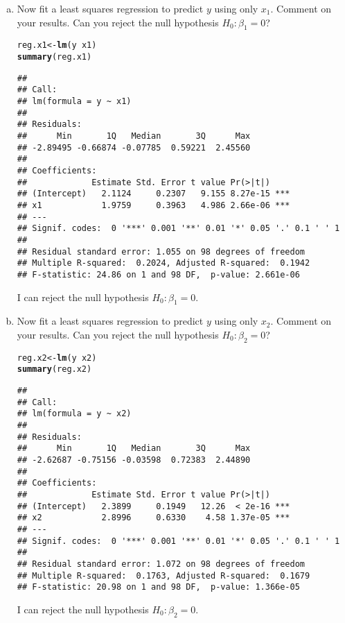 \documentclass[12pt]{article}\usepackage[]{graphicx}\usepackage[]{color}
\makeatletter
\newcommand{\hlopt}[1]{\textcolor[rgb]{0,0,0}{#1}}%
\newcommand{\hlstd}[1]{\textcolor[rgb]{0.345,0.345,0.345}{#1}}%
\newcommand{\hlkwb}[1]{\textcolor[rgb]{0.69,0.353,0.396}{#1}}%
\newcommand{\hlkwd}[1]{\textcolor[rgb]{0.737,0.353,0.396}{\textbf{#1}}}%
\newenvironment{kframe}{%
 \def\at@end@of@kframe{}%
 \ifinner\ifhmode%
  \def\at@end@of@kframe{\end{minipage}}%
  \begin{minipage}{\columnwidth}%
 \fi\fi%
 \def\FrameCommand##1{\hskip\@totalleftmargin \hskip-\fboxsep
 \colorbox{shadecolor}{##1}\hskip-\fboxsep
     \hskip-\linewidth \hskip-\@totalleftmargin \hskip\columnwidth}%
 \MakeFramed {\advance\hsize-\width
   \@totalleftmargin\z@ \linewidth\hsize
   \@setminipage}}%
 {\par\unskip\endMakeFramed%
 \at@end@of@kframe}
\newenvironment{knitrout}{}{} %
\theoremstyle{definition}
\makeatother
\begin{document}
\begin{enumerate}[1.]
\begin{enumerate}[(a)]
      \item Now fit a least squares regression to predict $y$ using only $x_1$. Comment on your results. Can you reject the null hypothesis $H_0 : \beta_1 = 0$?
\begin{knitrout}
\color{fgcolor}\begin{kframe}
\begin{alltt}
\hlstd{reg.x1} \hlkwb{<-} \hlkwd{lm}\hlstd{(y} \hlopt{~} \hlstd{x1)}
\hlkwd{summary}\hlstd{(reg.x1)}
\end{alltt}
\begin{verbatim}
## 
## Call:
## lm(formula = y ~ x1)
## 
## Residuals:
##      Min       1Q   Median       3Q      Max 
## -2.89495 -0.66874 -0.07785  0.59221  2.45560 
## 
## Coefficients:
##             Estimate Std. Error t value Pr(>|t|)    
## (Intercept)   2.1124     0.2307   9.155 8.27e-15 ***
## x1            1.9759     0.3963   4.986 2.66e-06 ***
## ---
## Signif. codes:  0 '***' 0.001 '**' 0.01 '*' 0.05 '.' 0.1 ' ' 1
## 
## Residual standard error: 1.055 on 98 degrees of freedom
## Multiple R-squared:  0.2024,	Adjusted R-squared:  0.1942 
## F-statistic: 24.86 on 1 and 98 DF,  p-value: 2.661e-06
\end{verbatim}
\end{kframe}
\end{knitrout}
      I can reject the null hypothesis $H_0 : \beta_1 = 0$.

      \item Now fit a least squares regression to predict $y$ using only $x_2$. Comment on your results. Can you reject the null hypothesis $H_0 : \beta_2  = 0$?
\begin{knitrout}
\color{fgcolor}\begin{kframe}
\begin{alltt}
\hlstd{reg.x2} \hlkwb{<-} \hlkwd{lm}\hlstd{(y} \hlopt{~} \hlstd{x2)}
\hlkwd{summary}\hlstd{(reg.x2)}
\end{alltt}
\begin{verbatim}
## 
## Call:
## lm(formula = y ~ x2)
## 
## Residuals:
##      Min       1Q   Median       3Q      Max 
## -2.62687 -0.75156 -0.03598  0.72383  2.44890 
## 
## Coefficients:
##             Estimate Std. Error t value Pr(>|t|)    
## (Intercept)   2.3899     0.1949   12.26  < 2e-16 ***
## x2            2.8996     0.6330    4.58 1.37e-05 ***
## ---
## Signif. codes:  0 '***' 0.001 '**' 0.01 '*' 0.05 '.' 0.1 ' ' 1
## 
## Residual standard error: 1.072 on 98 degrees of freedom
## Multiple R-squared:  0.1763,	Adjusted R-squared:  0.1679 
## F-statistic: 20.98 on 1 and 98 DF,  p-value: 1.366e-05
\end{verbatim}
\end{kframe}
\end{knitrout}
      I can reject the null hypothesis $H_0 : \beta_2 = 0$.


\end{enumerate}
\end{enumerate}
\end{document}
